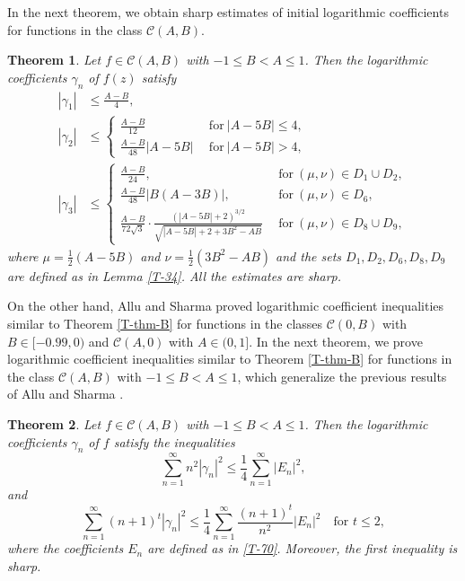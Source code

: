 \documentclass[a4paper,12pt]{amsart}
\newtheorem{thm}{Theorem}[section]
\theoremstyle{definition}
\begin{document}
In the next theorem, we obtain sharp estimates of initial logarithmic coefficients for functions in the class $\mathcal{C}(A,B)$.

\begin{thm}\label{T-thm-20}
Let \( f \in \mathcal{C}(A,B) \) with \( -1 \leq B < A \leq 1 \). Then the logarithmic coefficients \( \gamma_n \) of \( f(z) \) satisfy
\begin{align*}
|\gamma_1| &\leq \frac{A - B}{4},\\
|\gamma_2| &\leq 
\begin{cases}
\displaystyle \frac{A-B}{12} & ~~\text{for}~ |A-5B|\le 4,\\[2mm]
\displaystyle \frac{A-B}{48}|A-5B| & ~~\text{for}~ |A-5B|>4,
 \end{cases}\\[3mm]
|\gamma_3| &\leq 
\begin{cases}
\displaystyle \frac{A - B}{24}, &~~\text{for}~(\mu,\nu)\in D_1\cup D_2, \\[2mm]
\displaystyle \frac{A - B}{48}|B(A - 3B)|, & ~~\text{for}~(\mu,\nu)\in D_6, \\[2mm]
\displaystyle \frac{A-B}{72\sqrt{3}} \cdot \frac{\left( |A - 5B| + 2 \right)^{3/2}}{\sqrt{|A - 5B| + 2 + 3B^{2} - AB}}  & ~~\text{for}~(\mu,\nu)\in D_8\cup D_9,
\end{cases}
\end{align*}
where \(\mu = \frac{1}{2}(A - 5B)\) and \(\nu = \frac{1}{2}(3B^2 - AB)\) and the sets $D_1,D_2, D_6, D_8,D_9$ are defined as in Lemma \ref{T-34}.
All the estimates are sharp.
\end{thm}



On the other hand, Allu and Sharma \cite{Allu-Sharma-2024} proved logarithmic coefficient inequalities similar to Theorem \ref{T-thm-B} for functions in the classes $\mathcal{C}(0,B)$ with $B\in [-0.99,0)$ and $\mathcal{C}(A,0)$ with $A\in (0,1]$.
In the next theorem, we prove logarithmic coefficient inequalities similar to Theorem \ref{T-thm-B} for functions in the class $\mathcal{C}(A,B)$ with $-1\leq B< A \leq 1$, which generalize the previous results of Allu and Sharma \cite{Allu-Sharma-2024}.


\begin{thm}\label{T-thm-10}
Let $ f \in \mathcal{C}(A,B) $ with $-1\leq B< A \leq 1$. Then the logarithmic coefficients $\gamma_n$ of $ f $ satisfy the inequalities  
$$
\sum_{n=1}^{\infty} n^2 |\gamma_n|^2 \leq \frac{1}{4} \sum_{n=1}^{\infty} |E_n|^2,
$$
and  
$$
\sum_{n=1}^{\infty} (n+1)^t |\gamma_n|^2 \leq \frac{1}{4} \sum_{n=1}^{\infty} \frac{(n+1)^t}{n^2} |E_n|^2 \quad \text{for } t \leq 2,
$$
where the coefficients $E_n$ are defined as in \eqref{T-70}. Moreover, the first inequality is sharp.
\end{thm}
\end{document}
